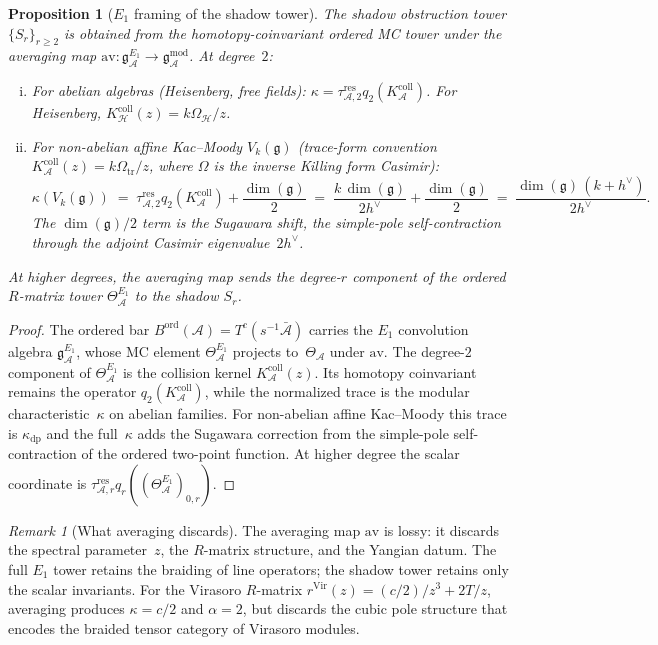 \documentclass[11pt,reqno]{amsart}
\newtheorem{proposition}[theorem]{Proposition}
\theoremstyle{definition}
\theoremstyle{remark}
\newtheorem{remark}[theorem]{Remark}
\newcommand{\cA}{\mathcal{A}}
\newcommand{\fg}{\mathfrak{g}}
\newcommand{\Vir}{\mathrm{Vir}}
\numberwithin{equation}{section}
\begin{document}
\begin{proposition}[$E_1$ framing of the shadow
tower]\label{prop:e1-framing}
The shadow obstruction tower $\{S_r\}_{r \ge 2}$ is obtained from
the homotopy-coinvariant ordered MC tower under the averaging
map $\mathrm{av}\colon \mathfrak{g}^{E_1}_\cA \to
\mathfrak{g}^{\mathrm{mod}}_\cA$. At degree~$2$:
\begin{enumerate}[(i)]
\item For abelian algebras (Heisenberg, free fields):
 $\kappa=\tau_{\cA,2}^{\mathrm{res}}q_2(K_\cA^{\mathrm{coll}})$.
 For Heisenberg,
 $K_{\mathcal H}^{\mathrm{coll}}(z)=k\Omega_{\mathcal H}/z$.

\item For non-abelian affine Kac--Moody $V_k(\fg)$
 (trace-form convention $K_\cA^{\mathrm{coll}}(z)=k\Omega_{\mathrm{tr}}/z$, where $\Omega$
 is the inverse Killing form Casimir):
 \[
  \kappa(V_k(\fg))
  \;=\;
  \tau_{\cA,2}^{\mathrm{res}}q_2(K_\cA^{\mathrm{coll}})
  + \frac{\dim(\fg)}{2}
  \;=\;
  \frac{k\,\dim(\fg)}{2h^\vee}
  + \frac{\dim(\fg)}{2}
  \;=\;
  \frac{\dim(\fg)\,(k + h^\vee)}{2h^\vee}.
 \]
 The $\dim(\fg)/2$ term is the Sugawara shift, the
 simple-pole self-contraction through the adjoint Casimir
 eigenvalue~$2h^\vee$.
\end{enumerate}
At higher degrees, the averaging map sends the degree-$r$
component of the ordered $R$-matrix tower
$\Theta_\cA^{E_1}$ to the shadow $S_r$.
\end{proposition}

\begin{proof}
The ordered bar $B^{\mathrm{ord}}(\cA) =
T^c(s^{-1}\bar{\cA})$ carries the $E_1$ convolution algebra
$\mathfrak{g}^{E_1}_\cA$, whose MC element
$\Theta_\cA^{E_1}$ projects to~$\Theta_\cA$ under
$\mathrm{av}$. The degree-$2$ component of
$\Theta_\cA^{E_1}$ is the collision kernel
$K_\cA^{\mathrm{coll}}(z)$. Its homotopy coinvariant remains the
operator $q_2(K_\cA^{\mathrm{coll}})$, while the normalized trace is
the modular characteristic~$\kappa$ on abelian families. For
non-abelian affine Kac--Moody this trace is $\kappa_{\mathrm{dp}}$
and the full~$\kappa$ adds the
Sugawara correction from the simple-pole self-contraction of the
ordered two-point function. At higher degree the scalar coordinate is
$\tau_{\cA,r}^{\mathrm{res}}q_r((\Theta_\cA^{E_1})_{0,r})$.
\end{proof}

\begin{remark}[What averaging
discards]\label{rem:averaging-lossy}
The averaging map $\mathrm{av}$ is lossy: it discards the
spectral parameter~$z$, the $R$-matrix structure, and the
Yangian datum. The full $E_1$ tower retains the braiding of
line operators; the shadow tower retains only the scalar
invariants. For the Virasoro $R$-matrix
$r^{\Vir}(z) = (c/2)/z^3 + 2T/z$,
averaging produces
$\kappa = c/2$ and $\alpha = 2$, but discards the cubic
pole structure that encodes the braided tensor category of
Virasoro modules.
\end{remark}
\end{document}
